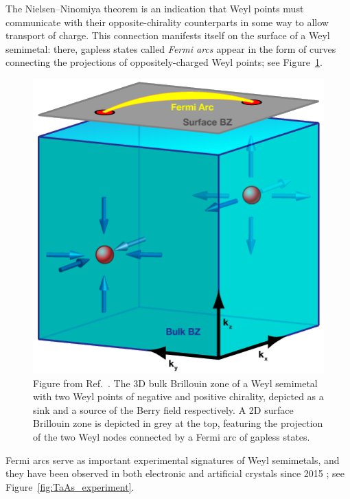 The Nielsen--Ninomiya theorem is an indication that Weyl points must communicate with their opposite-chirality counterparts in some way to allow transport of charge. This connection manifests itself on the surface of a Weyl semimetal: there, gapless states called \emph{Fermi arcs} appear in the form of curves connecting the projections of oppositely-charged Weyl points; see Figure~\ref{fig:WSM_bulk+arc}.
\begin{figure}[htb!]
	\centering
	\includegraphics[width=.5\linewidth]{Images/WSM_bulk+arc}
	\caption{Figure from Ref.~\cite{Balents_WSM}. The 3D bulk Brillouin zone of a Weyl semimetal with two Weyl points of negative and positive chirality, depicted as a sink and a source of the Berry field respectively. A 2D surface Brillouin zone is depicted in grey at the top, featuring the projection of the two Weyl nodes connected by a Fermi arc of gapless states.}
	\label{fig:WSM_bulk+arc}
\end{figure}
Fermi arcs serve as important experimental signatures of Weyl semimetals, and they have been observed in both electronic and artificial crystals since 2015  \cite{Xu_TaAs,Xu_TaAp,Yang-TaAs,Lv_WSM-TaAs,Xu_WSM-experiment,Belopolski_minimal-WSM,Liu_photonic-Chern-vector}; see Figure~\ref{fig:TaAs_experiment}.
